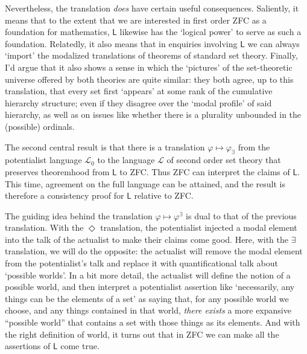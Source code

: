 \documentclass{article}
\begin{document}
Nevertheless, the translation \emph{does} have certain useful consequences. Saliently, 
it means that to the extent that we are interested in first order ZFC as a foundation 
for mathematics, $\mathsf{L}$ likewise has the `logical power' to serve as such a foundation.
Relatedly, it also means that in enquiries involving $\mathsf{L}$ we can always `import'
the modalized translations of theorems of standard set theory. Finally, I'd argue 
that it also shows a sense in which the `pictures' of the set-theoretic universe
offered by both theories are quite similar: they both agree, up to this translation, 
that every set first `appears' at some rank of the cumulative hierarchy structure; 
even if they disagree over the `modal profile' of said hierarchy, as well as on issues 
like whether there is a plurality unbounded in the (possible) ordinals.

The second central result is that there is a translation $\varphi \mapsto \varphi_\exists$ from the 
potentialist language $\mathcal{L}_0$ to the language $\mathcal{L}$ of second order 
set theory that preserves theoremhood from $\mathsf{L}$ to ZFC. Thus ZFC can 
interpret the claims of $\mathsf{L}$. This time, agreement on the full language can be 
attained, and the result is therefore a consistency proof for $\mathsf{L}$ relative to ZFC.





The guiding idea behind the translation  $\varphi \mapsto \varphi^\exists$ is 
dual to that of the previous translation.
With the $\Diamond$ translation, the potentialist injected a modal element into 
the talk of the actualist to make their claims come good. Here, with the $\exists$ translation,
we will do the opposite: the actualist will remove the modal element from 
the potentialist's talk and replace it 
with quantificational talk about `possible worlds'.
In a bit more detail,
the actualist will define the notion of a possible world, 
and then interpret a potentialist assertion 
like `necessarily, any things can be the elements of a set' as saying that, 
for any possible world 
we choose, and any things contained in that world, 
\emph{there exists} a more expansive ``possible 
world'' that contains a set with those things as its elements. And with the right 
definition of world, it turns out that in ZFC we can make all the assertions of 
$\mathsf{L}$ come true. 
\end{document}
